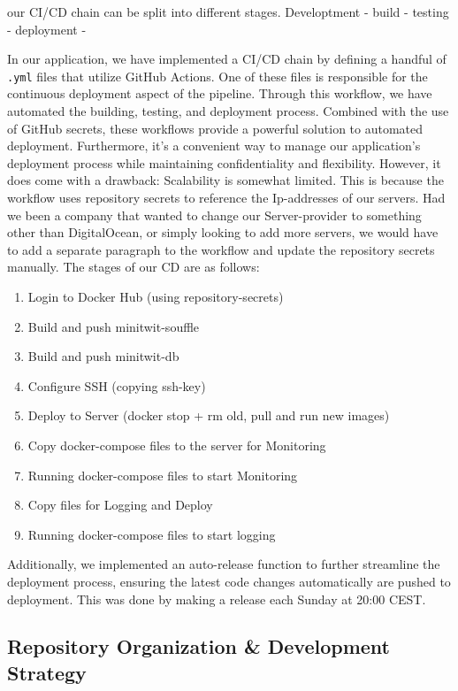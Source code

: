 our CI/CD chain can be split into different stages. 
Developtment
- 
build
- 
testing
- 
deployment
- 

In our application, we have implemented a CI/CD chain by defining a handful of \texttt{.yml} files that utilize GitHub Actions. One of these files is responsible for the continuous deployment aspect of the pipeline. Through this workflow, we have automated the building, testing, and deployment process. Combined with the use of GitHub secrets, these workflows provide a powerful solution to automated deployment. Furthermore, it's a convenient way to manage our application's deployment process while maintaining confidentiality and flexibility. 
However, it does come with a drawback: Scalability is somewhat limited. This is because the workflow uses repository secrets to reference the Ip-addresses of our servers.
Had we been a company that wanted to change our Server-provider to something other than DigitalOcean, or simply looking to add more servers, we would have to add a separate paragraph to the workflow and update the repository secrets manually.
\newpage
\noindent The stages of our CD are as follows:

\begin{enumerate}
    \item Login to Docker Hub (using repository-secrets)
    \item Build and push minitwit-souffle
    \item Build and push minitwit-db
    \item Configure SSH (copying ssh-key)
    \item Deploy to Server (docker stop + rm old, pull and run new images)
    \item Copy docker-compose files to the server for Monitoring
    \item Running docker-compose files to start Monitoring
    \item Copy files for Logging and Deploy
    \item Running docker-compose files to start logging
\end{enumerate}

\noindent Additionally, we implemented an auto-release function to further streamline the deployment process, ensuring the latest code changes automatically are pushed to deployment. This was done by making a release each Sunday at 20:00 CEST. 



\subsection{Repository Organization \& Development Strategy}
